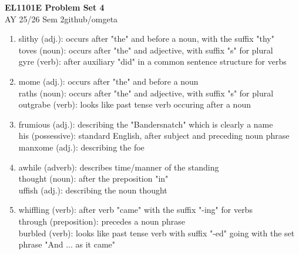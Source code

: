 \documentclass[12pt, a4paper]{article}
\newcommand{\mytitle}{EL1101E Problem Set 4}
\newcommand{\myauthor}{github/omgeta}
\newcommand{\mydate}{AY 25/26 Sem 2}
\begin{document}
\raggedright
\footnotesize
\begin{center}
{\normalsize{\textbf{\mytitle}}} \\
{\footnotesize{\mydate\hspace{2pt}\textemdash\hspace{2pt}\myauthor}}
\end{center}
\begin{enumerate}[Q\arabic*.]
  \item slithy (adj.): occurs after "the" and before a noun, with the suffix "thy"\\ 
    toves (noun): occurs after "the" and adjective, with suffix "s" for plural\\ 
    gyre (verb): after auxiliary "did" in a common sentence structure for verbs

  \item mome (adj.): occurs after "the" and before a noun \\ 
    raths (noun): occurs after "the" and adjective, with suffix "s" for plural\\ 
    outgrabe (verb): looks like past tense verb occuring after a noun

  \item frumious (adj.): describing the "Bandersnatch" which is clearly a name\\ 
    his (possessive): standard English, after subject and preceding noun phrase\\
    manxome (adj.): describing the foe

  \item awhile (adverb): describes time/manner of the standing\\ 
    thought (noun): after the preposition "in"\\ 
    uffish (adj.): describing the noun thought

  \item whiffling (verb): after verb "came" with the suffix "-ing" for verbs\\
    through (preposition): precedes a noun phrase\\
    burbled (verb): looks like past tense verb with suffix "-ed" going with the set phrase "And ... as it came"
\end{enumerate}
\end{document}

